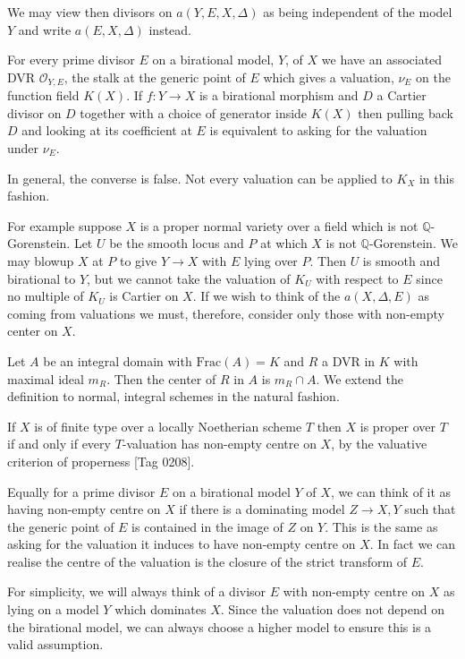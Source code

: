 \documentclass[a4paper,12pt]{book}
\begin{document}
We may view then divisors on $a(Y,E,X,\Delta)$ as being independent of the model $Y$ and write $a(E,X,\Delta)$ instead. 

For every prime divisor $E$ on a birational model, $Y$, of $X$ we have an associated DVR $\mathcal{O}_{Y,E}$, the stalk at the generic point of $E$ which gives a valuation, $\nu_{E}$ on the function field $K(X)$. If $f:Y \to X$ is a birational morphism and $D$ a Cartier divisor on $D$ together with a choice of generator inside $K(X)$ then pulling back $D$ and looking at its coefficient at $E$ is equivalent to asking for the valuation under $\nu_{E}$. 

In general, the converse is false. Not every valuation can be applied to $K_{X}$ in this fashion.

For example suppose $X$ is a proper normal variety over a field which is not $\mathbb{Q}$-Gorenstein. Let $U$ be the smooth locus and $P$ at which $X$ is not $\mathbb{Q}$-Gorenstein. We may blowup $X$ at $P$ to give $Y \to X$ with $E$ lying over $P$. Then $U$ is smooth and birational to $Y$, but we cannot take the valuation of $K_{U}$ with respect to $E$ since no multiple of $K_{U}$ is Cartier on $X$. If we wish to think of the $a(X,\Delta,E)$ as coming from valuations we must, therefore, consider only those with non-empty center on $X$. 

\begin{definition}
	Let $A$ be an integral domain with $\text{Frac}(A)=K$ and $R$ a DVR in $K$ with maximal ideal $m_{R}$. Then the center of $R$ in $A$ is $m_{R}\cap A$. We extend the definition to normal, integral schemes in the natural fashion.
\end{definition}

If $X$ is of finite type over a locally Noetherian scheme $T$ then $X$ is proper over $T$ if and only if every $T$-valuation has non-empty centre on $X$, by the valuative criterion of properness \cite{stacks-project}[Tag 0208]. 

Equally for a prime divisor $E$ on a birational model $Y$ of $X$, we can think of it as having non-empty centre on $X$ if there is a dominating model $Z \to X,Y$ such that the generic point of $E$ is contained in the image of $Z$ on $Y$. This is the same as asking for the valuation it induces to have non-empty centre on $X$. In fact we can realise the centre of the valuation is the closure of the strict transform of $E$.

For simplicity, we will always think of a divisor $E$ with non-empty centre on $X$ as lying on a model $Y$ which dominates $X$. Since the valuation does not depend on the birational model, we can always choose a higher model to ensure this is a valid assumption. 
\end{document}
